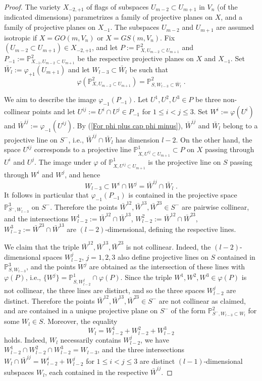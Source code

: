 \documentclass[12pt]{amsart}
\def\PP {{\mathbb P}}     %
\begin{document}
\begin{proof}
The variety $X_{-2,+1}$ of flags of subspaces $U_{m-2}\subset U_{m+1}$ in $V_n$ (of the indicated dimensions) parametrizes a family of projective planes on $X$, and a family of projective planes on $X_{-1}$. The subspaces $U_{m-2}$ and $U_{m+1}$ are assumed isotropic if $X=GO(m,V_n)$ or $X=GS(m,V_n)$. Fix $(U_{m-2}\subset U_{m+1})\in X_{-2,+1}$, and let $P:=\PP^2_{X,U_{m-2}\subset U_{m+1}}$ and $P_{-1}:=\PP^{2}_{X_{-1},U_{m-2}\subset U_{m+1}}$ be the respective projective planes on $X$ and $X_{-1}$. Set $\bar W_{l}:=\varphi_{+1}(U_{m+1})$ and let $W_{l-3}\subset \bar W_{l}$ be such that
$$
\varphi(\PP^2_{X,U_{m-2}\subset U_{m+1}}) = \PP^2_{S,W_{l-3}\subset \bar W_{l}} \;.
$$

We aim to describe the image $\varphi_{-1}(P_{-1})$. Let $U^1,U^2,U^3\in P$ be three non-collinear points and let $U^{ij}:=U^i\cap U^j\in P_{-1}$ for $1\leq i<j\leq 3$. Set $W^i:=\varphi(U^i)$ and $\bar W^{ij}:=\varphi_{-1}(U^{ij})$. By (\ref{For phi plus cap phi minus}), $\bar W^{ij}$ and $\bar W_l$ belong to a projective line on $S^{-}$, i.e., $\bar W^{ij}\cap \bar W_l$ has dimension $l-2$. On the other hand, the space $U^{ij}$ corresponds to a projective line $\PP^1_{X,U^{ij}\subset U_{m+1}}\subset P$ on $X$ passing through $U^i$ and $U^j$. The image under $\varphi$ of $\PP^1_{X,U^{ij}\subset U_{m+1}}$ is the projective line on $S$ passing through $W^i$ and $W^j$, and hence
$$
W_{l-3}\subset W^i\cap W^j = \bar W^{ij}\cap \bar W_l \;.
$$
It follows in particular that $\varphi_{-1}(P_{-1})$ is contained in the projective space $\PP^{3}_{S^{-},W_{l-3}}$ on $S^{-}$. Therefore the points $\bar W^{12},\bar W^{13},\bar W^{23}\in S^{-}$ are pairwise collinear, and the intersections $W^1_{l-2}:=\bar W^{12}\cap \bar W^{13}$, $W^2_{l-2}:=\bar W^{12}\cap\bar W^{23}$, $W^3_{l-2}:=\bar W^{23}\cap \bar W^{13}$ are $(l-2)$-dimensional, defining the respective lines.

We claim that the triple $\bar W^{12},\bar W^{13},\bar W^{23}$ is not collinear. Indeed, the $(l-2)$-dimensional spaces $W^j_{l-2}$, $j=1,2,3$ also define projective lines on $S$ contained in $\PP^3_{S,W_{l-3}}$, and the points $W^j$ are obtained as the intersection of these lines with $\varphi(P)$, i.e., $\{W^j\}= \PP^1_{S,W^j_{l-2}}\cap\varphi(P)$. Since the triple $W^1,W^2,W^3\in\varphi(P)$ is not collinear, the three lines are distinct, and so the three spaces $W^j_{l-2}$ are distinct. Therefore the points $\bar W^{12},\bar W^{13},\bar W^{23}\in S^{-}$ are not collinear as claimed, and are contained in a unique projective plane on $S^{-}$ of the form $\PP^{2}_{S^{-},W_{l-3}\subset W_l}$ for some $W_l\in S$. Moreover, the equality
$$
W_l= W^1_{l-2} + W^2_{l-2} + W^3_{l-2}
$$
holds. Indeed, $W_l$ necessarily contains $W^j_{l-2}$, we have $W^1_{l-2} \cap W^2_{l-2} \cap W^3_{l-2}=W_{l-3}$, and the three intersections $W_l\cap \bar W^{ij}= W^i_{l-2}+W^j_{l-2}$ for $1\leq i<j\leq 3$ are distinct $(l-1)$-dimensional subspaces $W_l$, each contained in the respective $\bar W^{ij}$.


\end{proof}
\end{document}
